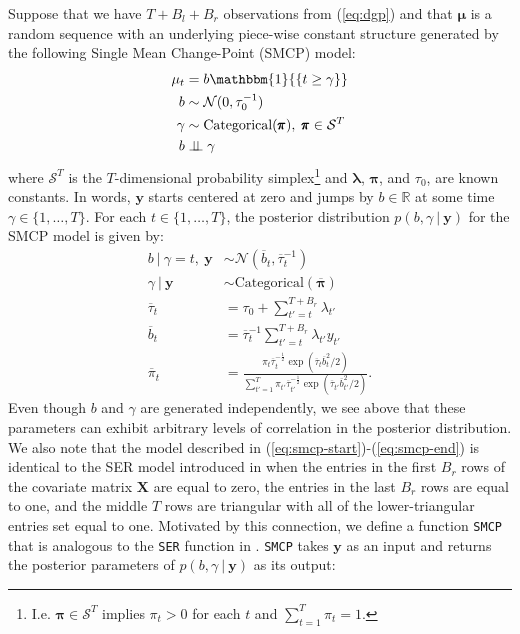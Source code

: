 Suppose that we have $T+B_l+B_r$ observations from (\ref{eq:dgp}) and that $\pmb{\mu}$ is a random sequence with an underlying piece-wise constant structure generated by the following Single Mean Change-Point (SMCP) model:
\begin{align} \label{eq:smcp-start}
    \mu_t &= b\mathbbm{1}{\left\{t\geq \gamma \right\}} \\
    b &\sim \mathcal{N}(0,\tau_0^{-1}) \\
    \gamma &\sim \text{Categorical}(\pmb{\pi}),\; \pmb{\pi} \in \mathcal{S}^T \\
    b &\indep \gamma
    \label{eq:smcp-end}
\end{align}
where $\mathcal{S}^T$ is the $T$-dimensional probability simplex\footnote{I.e. $\pmb{\pi} \in \mathcal{S}^T$ implies $\pi_t > 0$ for each $t$ and $\sum_{t=1}^T \pi_t = 1$.} and $\pmb{\lambda}$, $\pmb{\pi}$, and $\tau_0$, are known constants. In words, $\mathbf{y}$ starts centered at zero and jumps by $b\in\mathbb{R}$ at some time $\gamma \in \{1,\ldots,T\}$. For each $t \in\{1, \ldots, T\}$, the posterior distribution $p(b, \gamma \:|\: \mathbf{y})$ for the SMCP model is given by:
\begin{align}
    b \:|\: \gamma = t, \: \mathbf{y} &\sim \mathcal{N}\left(\overline{b}_{t}, \overline{\tau}_{t}^{-1}\right) \label{eq:b-smcp} \\
    \gamma \:|\: \mathbf{y} &\sim \text{Categorical}(\overline{\pmb{\pi}}) \label{eq:gamma-smcp} \\
    \overline{\tau}_t &= \tau_0 + \sum_{t'=t}^{T+B_r} \lambda_{t'} \\
    \overline{b}_t &= \overline{\tau}^{-1}_t\sum_{t'=t}^{T+B_r} \lambda_{t'} y_{t'} \\
    \overline{\pi}_t &= \frac{\pi_t\overline{\tau}^{-\frac{1}{2}}_t\exp\left(\overline{\tau}_t\overline{b}^2_t / 2\right)}{\sum_{t'=1}^T \pi_{t'}\overline{\tau}^{-\frac{1}{2}}_{t'}\exp\left(\overline{\tau}_{t'}\overline{b}^2_{t'} / 2\right)}.
\end{align}
Even though $b$ and $\gamma$ are generated independently, we see above that these parameters can exhibit arbitrary levels of correlation in the posterior distribution. We also note that the model described in (\ref{eq:smcp-start})-(\ref{eq:smcp-end}) is identical to the SER model introduced in \cite{Wang20} when the entries in the first $B_r$ rows of the covariate matrix $\mathbf{X}$ are equal to zero, the entries in the last $B_r$ rows are equal to one, and the middle $T$ rows are triangular with all of the lower-triangular entries set equal to one. Motivated by this connection, we define a function \texttt{SMCP} that is analogous to the \texttt{SER} function in \cite{Wang20}. \texttt{SMCP} takes $\mathbf{y}$ as an input and returns the posterior parameters of $p(b, \gamma\:|\:\mathbf{y})$ as its output: 
